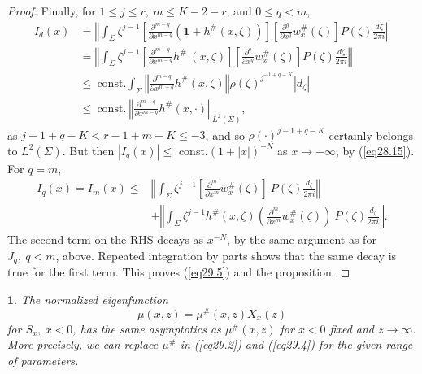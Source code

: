 \documentclass{surv-l}
\theoremstyle{plain}
\newtheorem{corollary}[theorem]{\sc{Corollary}}
\theoremstyle{definition}
\numberwithin{equation}{chapter}
\begin{document}
\begin{proof}
Finally, for $1\leq j\leq r,\ m\leq K-2-r$, and $0\leq q<m$,
\begin{align*}
I_{d}(x)&=\left\Vert\int_{\Sigma}\zeta^{j-1}\left[\frac{\partial^{m-q}}{\partial x^{m-q}}(\mathbf{1}+h^{\#} (x, \zeta))\right]\left[\frac{\partial^{q}}{\partial x^{q}}w_{x}^{\#}(\zeta)\right]P(\zeta)\frac{d{\zeta}}{2\pi i}\right\Vert\\
&=\left\Vert\int_{\Sigma}\zeta^{j-1}\left[\frac{\partial^{m-q}}{\partial x^{m-q}}h^{\#}\ (x, \zeta)\right]\left[\frac{\partial^{q}}{\partial x^{q}}w_{x}^{\#}(\zeta)\right]P(\zeta)\frac{d{\zeta}}{2\pi i}\right\Vert\\
&\leq\ \mathrm{const}. \int_{\Sigma}\left\Vert\frac{\partial^{m-q}}{\partial x^{m-q}}h^{\#} (x, \zeta)\right\Vert\rho(\zeta)^{j^{-1+q-K}}|d_{\zeta}|\\
&\leq\ \mathrm{const}.\ \left\Vert\frac{\partial^{m-q}}{\partial x^{m-q}}h^{\#}(x, \cdot)\right\Vert_{L^{2}(\Sigma)},
\end{align*}
as $j-1+q-K<r-1+m-K\leq-3$, and so $\rho(\cdot)^{j-1+q-K}$ certainly belongs to $L^{2}(\Sigma)$. But then $|I_{q}(x)|\leq$ const.$(1+|x|)^{-N}$ as $ x\rightarrow-\infty$, by (\ref{eq28.15}). For $q=m$,
\begin{align*}
I_{q}(x)=I_{m}(x)\leq&\left\Vert\int_{\Sigma}\zeta^{j-1}\left[\frac{\partial^{m}}{\partial x^{m}}w_{x}^{\#}(\zeta)\right]\  P(\zeta)\frac{d_{\zeta}}{2\pi i}\right\Vert\\
&+\left\Vert\int_{\Sigma}\zeta^{j-1}h^{\#}(x,\zeta)\left(\frac{\partial^{m}}{\partial x^{m}}w_{x}^{\#}(\zeta)\right)\  P(\zeta)\frac{d_{\zeta}}{2\pi i}\right\Vert.
\end{align*}
The second term on the RHS decays as $x^{-N}$, by the same argument as for $J_{q}, \ q<m$, above. Repeated integration by parts shows that the same decay is true for the first term. This proves (\ref{eq29.5}) and the proposition.
\end{proof}
\setcounter{theorem}{7}
\begin{corollary}\label{eq29.8} The normalized eigenfunction
\begin{equation*}
\mu(x, z)=\mu^{\#}(x, z)X_{x}(z)
\end{equation*}
for $S_{x},\ x<0$, has the same asymptotics as $\mu^{\#}(x, z)$ for
$x<0$ fixed and $z \rightarrow\infty$. More precisely, we can replace
$\mu^{\#}$ in \emph{(\ref{eq29.2})} and \emph{(\ref{eq29.4})} for the given range of parameters.
\end{corollary}
\end{document}
